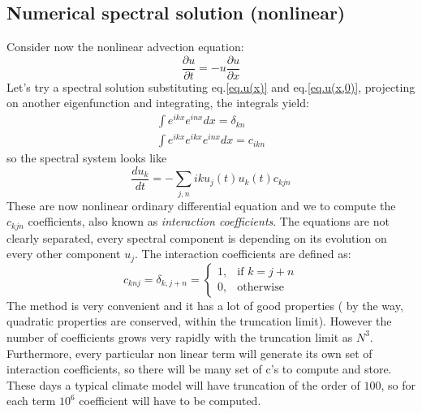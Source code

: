 \subsection{Numerical spectral solution (nonlinear)}
Consider now the nonlinear advection equation:
\begin{equation}
    \frac{\partial u}{\partial t}=-u\frac{\partial u}{\partial x}
\end{equation}
Let's try a spectral solution substituting eq.\ref{eq.u(x)} and eq.\ref{eq.u(x,0)}, projecting on another eigenfunction and integrating, the integrals yield: 
\begin{align*}
    \int e^{ikx}e^{inx}dx=\delta_{kn} \\
    \int e^{ikx}e^{ikx}e^{inx}dx=c_{ikn}
\end{align*}
so the spectral system looks like 
\begin{equation}\label{eq.spectral system nonlinear}
    \frac{du_k}{dt}=-\displaystyle\sum_{j,n}iku_j(t)u_k(t)c_{kjn}
    \end{equation}
These are now nonlinear ordinary differential equation and we to compute the $c_{kjn}$ coefficients, also known as \textit{interaction coefficients}. The equations are not clearly separated, every spectral component is depending on its evolution on every other component $u_j$. 
The interaction coefficients are defined as: 
\begin{equation}
    c_{knj}=\delta_{k,j+n}=\begin{cases}
        1, &\text{if $k=j+n$}\\
        0, &\text{otherwise}
    \end{cases}
\end{equation}
The method is very convenient and it has a lot of good properties ( by the way,
quadratic properties are conserved, within the truncation limit). However the
number of coefficients grows very rapidly with the truncation limit as $N^3$.
Furthermore, every particular non linear term will generate its own set of
interaction coefficients, so there will be many set of c’s to compute and store.
These days a typical climate model will have truncation of the order of $100$, so
for each term $10^6$ coefficient will have to be computed.
\\
[5 cm]
\\
